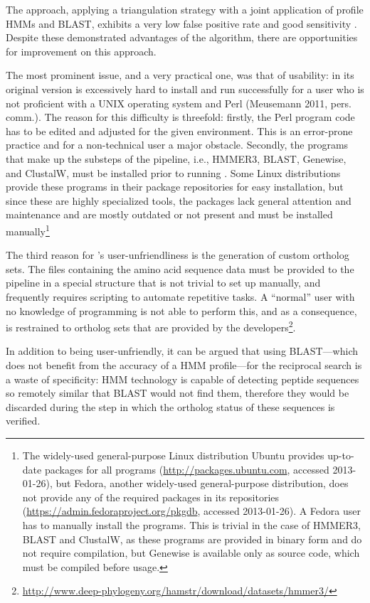The \hamstr approach, applying a triangulation strategy with a joint application
of profile HMMs and BLAST, exhibits a very low false positive rate and good
sensitivity \citep{ebersberger2009}. Despite these demonstrated advantages of
the \hamstr algorithm, there are opportunities for improvement on this approach.

The most prominent issue, and a very practical one, was that of usability:
\hamstr in its original version is excessively hard to install and run
successfully for a user who is not proficient with a UNIX operating system and
Perl (Meusemann 2011, pers. comm.). The reason for this difficulty is threefold:
firstly, the Perl program code has to be edited and adjusted for the given
environment. This is an error-prone practice and for a non-technical user a
major obstacle. Secondly, the programs that make up the substeps of the
pipeline, i.e., HMMER3, BLAST, Genewise, and ClustalW, must be installed prior
to running \hamstr. Some Linux distributions provide these programs in their
package repositories for easy installation, but since these are highly
specialized tools, the packages lack general attention and maintenance and are
mostly outdated or not present and must be installed manually\footnote{The
widely-used general-purpose Linux distribution Ubuntu provides up-to-date
packages for all programs (\url{http://packages.ubuntu.com}, accessed
2013-01-26), but Fedora, another widely-used general-purpose distribution, does
not provide any of the required packages in its repositories
(\url{https://admin.fedoraproject.org/pkgdb}, accessed 2013-01-26). A Fedora
user has to manually install the programs. This is trivial in the case of
HMMER3, BLAST and ClustalW, as these programs are provided in binary form and do
not require compilation, but Genewise is available only as source code, which
must be compiled before usage.}

The third reason for \hamstr's user-unfriendliness is the generation of custom
ortholog sets. The files containing the amino acid sequence data must be
provided to the pipeline in a special structure that is not trivial to set up
manually, and frequently requires scripting to automate repetitive tasks. A
``normal'' user with no knowledge of programming is not able to perform this,
and as a consequence, is restrained to ortholog sets that are provided by the
developers\footnote{\url{http://www.deep-phylogeny.org/hamstr/download/datasets/hmmer3/}}.

In addition to \hamstr being user-unfriendly, it can be argued that using
BLAST---which does not benefit from the accuracy of a HMM profile---for the
reciprocal search is a waste of specificity: HMM technology is capable of
detecting peptide sequences so remotely similar that BLAST would not find them,
therefore they would be discarded during the step in which the ortholog status
of these sequences is verified.

